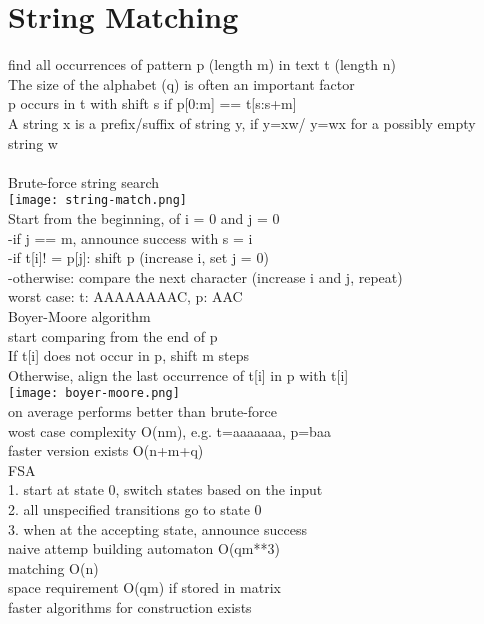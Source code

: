 \section{String Matching}
{\tiny find all occurrences of pattern p (length m) in text t (length n) \\
The size of the alphabet (q) is often an important factor\\
p occurs in t with shift s if p[0:m] == t[s:s+m]\\
A string x is a prefix/suffix of string y, if y=xw/ y=wx for a possibly empty string w\\}\\
\scriptsize{Brute-force string search}\\ 
\texttt{[image: string-match.png]}\\{\tiny Start from the beginning, of i = 0 and j = 0\\
-if j == m, announce success with s = i\\
-if t[i]! = p[j]: shift p (increase i, set j = 0)\\
-otherwise: compare the next character (increase i and j, repeat)\\
worst case: t: AAAAAAAAC, p: AAC}\\
\scriptsize{Boyer-Moore algorithm}\\
{\tiny start comparing from the end of p\\
If t[i] does not occur in p, shift m steps\\
Otherwise, align the last occurrence of t[i] in p with t[i]\\
\texttt{[image: boyer-moore.png]}\\
on average performs better than brute-force\\
wost case complexity O(nm), e.g. t=aaaaaaa, p=baa\\
faster version exists O(n+m+q)
}\\
\scriptsize{FSA}\\
{\tiny 1. start at state 0, switch states based on the input\\
2. all unspecified transitions go to state 0\\
3. when at the accepting state, announce success\\
naive attemp building automaton O(qm**3)\\
matching O(n)\\
space requirement O(qm) if stored in matrix\\
faster algorithms for construction exists
}\\
